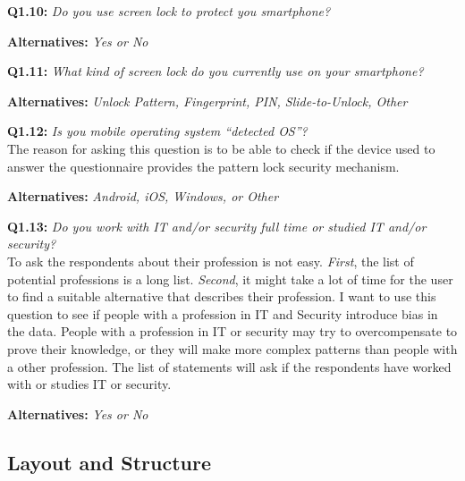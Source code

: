       {\bf Q1.10:} {\it Do you use screen lock to protect you smartphone?}
        \begin{enumerate*}
          \item[ ] {\bf Alternatives:} {\it Yes or No}
        \end{enumerate*}

      {\bf Q1.11:} {\it What kind of screen lock do you currently use on your smartphone?} \\
        \begin{enumerate*}
          \item[ ] {\bf Alternatives:} {\it Unlock Pattern, Fingerprint, PIN, Slide-to-Unlock, Other}
        \end{enumerate*}

      {\bf Q1.12:} {\it Is you mobile operating system ``detected OS''?} \\
      The reason for asking this question is to be able to check if the device used to answer the questionnaire provides the pattern lock security mechanism. 
        \begin{enumerate*}
          \item[ ] {\bf Alternatives:} {\it Android, iOS, Windows, or Other}
        \end{enumerate*}

      {\bf Q1.13:} {\it Do you work with IT and/or security full time or studied IT and/or security?} \\
      To ask the respondents about their profession is not easy. {\it First}, the list of potential professions is a long list. {\it Second}, it might take a lot of time for the user to find a suitable alternative that describes their profession. I want to use this question to see if people with a profession in IT and Security introduce bias in the data. People with a profession in IT or security may try to overcompensate to prove their knowledge, or they will make more complex patterns than people with a other profession. The list of statements will ask if the respondents have worked with or studies IT or security. 
        \begin{enumerate*}
          \item[ ] {\bf Alternatives:} {\it Yes or No}
        \end{enumerate*}

  \clearpage
  \subsection{Layout and Structure}\label{sec:layout}

